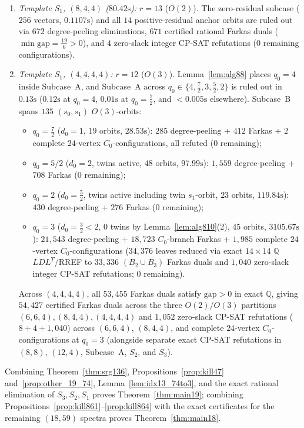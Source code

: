 \documentclass[11pt,reqno]{amsart}
\theoremstyle{definition}
\theoremstyle{remark}
\numberwithin{equation}{section}
\numberwithin{table}{section}
\begin{document}
\begin{enumerate}
  \item \emph{Template $S_1$, $(8, 4, 4)$ ($80.42\text{s}$):} $r = 13$ ($O(2)$). The zero-residual subcase ($256$ vectors, $0.1107\text{s}$) and all $14$ positive-residual anchor orbits are ruled out via $672$ degree-peeling eliminations, $671$ certified rational Farkas duals ($\min\text{gap} = \frac{19}{6} > 0$), and $4$ zero-slack integer CP-SAT refutations ($0$ remaining configurations).
  \item \emph{Template $S_1$, $(4, 4, 4, 4)$:} $r = 12$ ($O(3)$). Lemma~\ref{lem:alg88} places $q_0 = 4$ inside Subcase~A, and Subcase~A across $q_0 \in \{4, \frac{7}{2}, 3, \frac{5}{2}, 2\}$ is ruled out in $0.13\text{s}$ ($0.12\text{s}$ at $q_0 = 4$, $0.01\text{s}$ at $q_0 = \frac{7}{2}$, and $<0.005\text{s}$ elsewhere). Subcase~B spans $135$ $(s_0, s_1)$ $O(3)$-orbits:
  \begin{itemize}
    \item $q_0 = \frac{7}{2}$ ($d_0 = 1$, $19$ orbits, $28.53\text{s}$): $285$ degree-peeling + $412$ Farkas + $2$ complete $24$-vertex $C_0$-configurations, all refuted ($0$ remaining);
    \item $q_0 = 5/2$ ($d_0 = 2$, twins active, $48$ orbits, $97.99\text{s}$): $1{,}559$ degree-peeling + $708$ Farkas ($0$ remaining);
    \item $q_0 = 2$ ($d_0 = \frac{5}{2}$, twins active including twin $s_1$-orbit, $23$ orbits, $119.84\text{s}$): $430$ degree-peeling + $276$ Farkas ($0$ remaining);
    \item $q_0 = 3$ ($d_0 = \frac{3}{2} < 2$, $0$ twins by Lemma~\ref{lem:alg810}(2), $45$ orbits, $3105.67\text{s}$): $21{,}543$ degree-peeling + $18{,}723$ $C_0$-branch Farkas + $1{,}985$ complete $24$-vertex $C_0$-configurations ($34{,}376$ leaves reduced via exact $14 \times 14$ $\mathbb{Q}$ $LDL^T$/RREF to $33{,}336$ $(B_2 \cup B_3)$ Farkas duals and $1{,}040$ zero-slack integer CP-SAT refutations; $0$ remaining).
  \end{itemize}
  Across $(4, 4, 4, 4)$, all $53{,}455$ Farkas duals satisfy $\text{gap} > 0$ in exact $\mathbb{Q}$, giving $54{,}427$ certified Farkas duals across the three $O(2)/O(3)$ partitions $(6,6,4), (8,4,4), (4,4,4,4)$ and $1{,}052$ zero-slack CP-SAT refutations ($8 + 4 + 1{,}040$) across $(6,6,4)$, $(8,4,4)$, and complete $24$-vertex $C_0$-configurations at $q_0 = 3$ (alongside separate exact CP-SAT refutations in $(8,8)$, $(12,4)$, Subcase~A, $S_2$, and $S_3$).
\end{enumerate}

Combining Theorem~\ref{thm:srg136}, Propositions~\ref{prop:kill47} and~\ref{prop:other_19_74}, Lemma~\ref{lem:idx13_74to3}, and the exact rational elimination of $S_3, S_2, S_1$ proves Theorem~\ref{thm:main19}; combining Propositions~\ref{prop:kill861}--\ref{prop:kill864} with the exact certificates for the remaining $(18, 59)$ spectra proves Theorem~\ref{thm:main18}.
\end{document}
